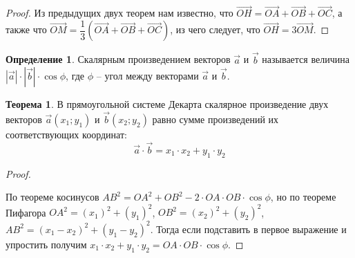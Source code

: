 \documentclass[12pt]{article}
\theoremstyle{definition}
\newtheorem{theorem}{Теорема}[section]
\newtheorem{definition}{Определение}
\begin{document}
    \begin{proof}
        Из предыдущих двух теорем нам известно, что $\overrightarrow{OH}=\overrightarrow{OA}+\overrightarrow{OB}+\overrightarrow{OC}$, а также что $\overrightarrow{OM}=\dfrac{1}{3}(\overrightarrow{OA}+\overrightarrow{OB}+\overrightarrow{OC})$, из чего следует, что $\overrightarrow{OH}=3\overrightarrow{OM}$.
    \end{proof}

\begin{definition}
    Скалярным произведением векторов $\Vec{a}$ и $\Vec{b}$ называется величина $|\Vec{a}|\cdot |\Vec{b}|\cdot \cos \phi$, где $\phi$ -- угол между векторами $\Vec{a}$ и $\Vec{b}$.
\end{definition}

\begin{theorem}
    В прямоугольной системе Декарта скалярное произведение двух векторов $\Vec{a}(x_1;y_1)$ и $\Vec{b}(x_2;y_2)$ равно сумме произведений их соответствующих координат: 
    $$\Vec{a}\cdot \Vec{b}=x_1\cdot x_2 + y_1\cdot y_2$$
\end{theorem}
    \begin{proof}
    $ $\newline
    \begin{center}
    \end{center}
        По теореме косинусов $AB^2=OA^2+OB^2-2\cdot OA\cdot OB \cdot \cos \phi$, но по теореме Пифагора $OA^2=(x_1)^2+(y_1)^2$, $OB^2=(x_2)^2+(y_2)^2$, $AB^2=(x_1-x_2)^2+(y_1-y_2)^2$. Тогда если подставить в первое выражение и упростить получим $x_1\cdot x_2 + y_1\cdot y_2=OA\cdot OB\cdot \cos \phi$.
    \end{proof}
\end{document}
